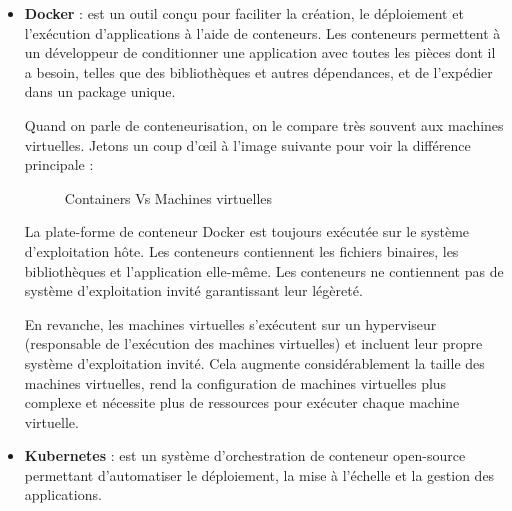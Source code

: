 \begin{itemize}
\item \textbf{Docker} : est un outil con\c{c}u pour faciliter la cr\'eation, le d\'eploiement et l'ex\'ecution d'applications \`a l'aide de conteneurs. Les conteneurs permettent \`a un d\'eveloppeur de conditionner une application avec toutes les pi\`eces dont il a besoin, telles que des biblioth\`eques et autres d\'ependances, et de l'exp\'edier dans un package unique.

Quand on parle de conteneurisation, on le compare tr\`es souvent aux machines virtuelles. Jetons un coup d'\oe{}il à l'image suivante pour voir la diff\'erence principale :

\begin{figure}[H]
	\caption{\label{fig:my-label} Containers Vs Machines virtuelles}
\end{figure}

La plate-forme de conteneur Docker est toujours ex\'ecut\'ee sur le syst\`eme d'exploitation h\^ote. Les conteneurs contiennent les fichiers binaires, les biblioth\`eques et l'application elle-m\^eme. Les conteneurs ne contiennent pas de syst\`eme d'exploitation invit\'e garantissant leur l\'eg\`eret\'e.

En revanche, les machines virtuelles s'ex\'ecutent sur un hyperviseur (responsable de l'ex\'ecution des machines virtuelles) et incluent leur propre syst\`eme d'exploitation invit\'e. Cela augmente consid\'erablement la taille des machines virtuelles, rend la configuration de machines virtuelles plus complexe et n\'ecessite plus de ressources pour ex\'ecuter chaque machine virtuelle.


\item \textbf{Kubernetes} : est un syst\`eme d'orchestration de conteneur open-source permettant d'automatiser le d\'eploiement, la mise \`a l'\'echelle et la gestion des applications.


\end{itemize}
